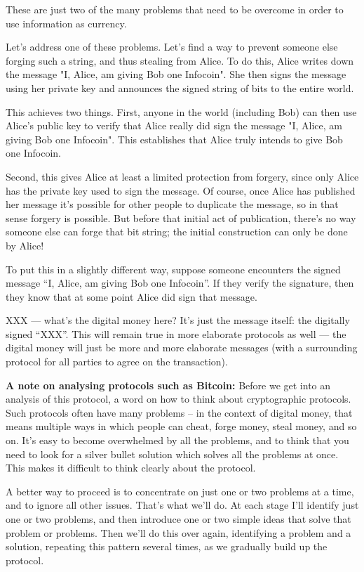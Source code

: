 \documentclass[12pt]{book}
\newcounter{problem}[chapter]
\begin{document}
These are just two of the many problems that need to be overcome in
order to use information as currency.

Let's address one of these problems.  Let's find a way to prevent
someone else forging such a string, and thus stealing from Alice.  To
do this, Alice writes down the message "I, Alice, am giving Bob one
Infocoin".  She then signs the message using her private key and
announces the signed string of bits to the entire world.

This achieves two things.  First, anyone in the world (including Bob)
can then use Alice's public key to verify that Alice really did sign
the message "I, Alice, am giving Bob one Infocoin".  This establishes
that Alice truly intends to give Bob one Infocoin.

Second, this gives Alice at least a limited protection from forgery,
since only Alice has the private key used to sign the message.  Of
course, once Alice has published her message it's possible for other
people to duplicate the message, so in that sense forgery is possible.
But before that initial act of publication, there's no way someone
else can forge that bit string; the initial construction can only be
done by Alice!  

To put this in a slightly different way, suppose someone encounters
the signed message ``I, Alice, am giving Bob one Infocoin''.  If they
verify the signature, then they know that at some point Alice did sign
that message.

XXX --- what's the digital money here?  It's just the message itself:
the digitally signed ``XXX''.  This will remain true in more elaborate
protocols as well --- the digital money will just be more and more
elaborate messages (with a surrounding protocol for all parties to
agree on the transaction).

\textbf{A note on analysing protocols such as Bitcoin:} Before we get
into an analysis of this protocol, a word on how to think about
cryptographic protocols.  Such protocols often have many problems --
in the context of digital money, that means multiple ways in which
people can cheat, forge money, steal money, and so on.  It's easy to
become overwhelmed by all the problems, and to think that you need to
look for a silver bullet solution which solves all the problems at
once.  This makes it difficult to think clearly about the protocol.

A better way to proceed is to concentrate on just one or two problems
at a time, and to ignore all other issues.  That's what we'll do.  At
each stage I'll identify just one or two problems, and then introduce
one or two simple ideas that solve that problem or problems.  Then
we'll do this over again, identifying a problem and a solution,
repeating this pattern several times, as we gradually build up the
protocol.
\end{document}
